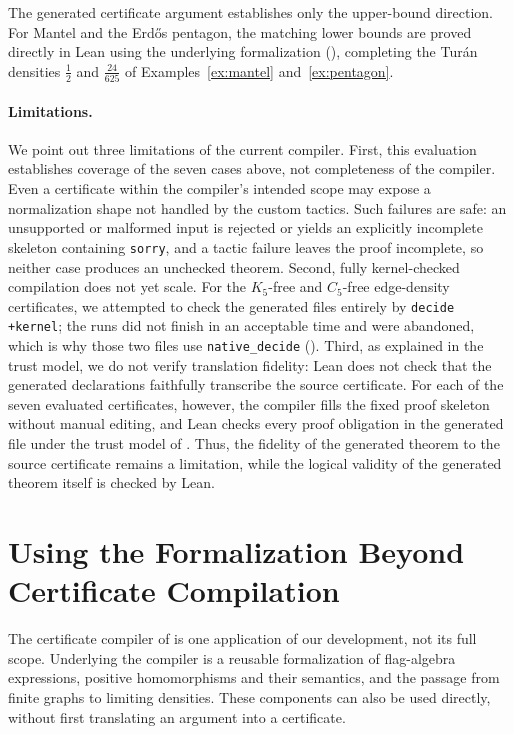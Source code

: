 \documentclass{article}
\newcommand{\lean}[1]{\texttt{#1}}
\begin{document}
The generated certificate argument establishes only the upper-bound direction.
For Mantel and the Erd\H{o}s pentagon,
the matching lower bounds are proved directly in Lean using the underlying
formalization (), completing the
Tur\'an densities $\tfrac12$ and $\tfrac{24}{625}$ of Examples~\ref{ex:mantel}
and~\ref{ex:pentagon}.

\paragraph{Limitations.}
\label{sec:flagmatic-open}
We point out three limitations of the current compiler.
First, this evaluation establishes coverage of the seven cases above, not
completeness of the compiler.  Even a certificate within the compiler's
intended scope may expose a normalization shape not handled by the custom
tactics.  Such failures are safe: an unsupported or malformed input is
rejected or yields an explicitly incomplete skeleton containing \lean{sorry},
and a tactic failure leaves the proof incomplete, so neither case produces an
unchecked theorem.
Second, fully kernel-checked compilation does not yet scale.  For the
$K_5$-free and $C_5$-free edge-density certificates, we attempted to check the
generated files entirely by \lean{decide +kernel}; the runs did not finish in
an acceptable time and were abandoned, which is why those two files use
\lean{native\_decide} ().
Third, as explained in the trust model, we do not verify translation fidelity:
Lean does not check that the generated declarations faithfully transcribe the
source certificate.  For each of the seven evaluated certificates, however,
the compiler fills the fixed proof skeleton without manual editing, and Lean
checks every proof obligation in the generated file under the trust model of
.  Thus, the fidelity of the generated theorem to the
source certificate remains a limitation, while the logical validity of the
generated theorem itself is checked by Lean.

\section{Using the Formalization Beyond Certificate Compilation}
\label{sec:lowerbounds}

The certificate compiler of  is one application of our
development, not its full scope.  Underlying the compiler is a reusable
formalization of flag-algebra expressions, positive homomorphisms and their
semantics, and the passage from finite graphs to limiting densities.  These
components can also be used directly, without first translating an argument
into a certificate.
\end{document}
